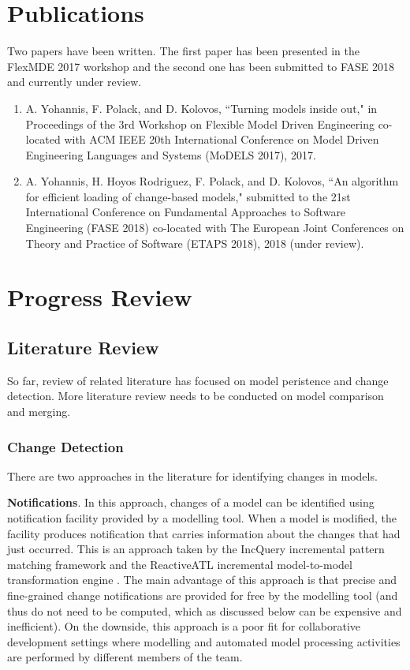 \documentclass[12pt, a4paper]{report} \usepackage[titletoc]{appendix}
\begin{document}
\chapter{Publications}
\label{ch:publications}
Two papers have been written. The first paper \cite{yohannis2017turning} has been presented in the FlexMDE 2017 workshop and the second one \cite{yohannis2018algorithm} has been submitted to FASE 2018 and currently under review.
\begin{enumerate}
	\item A. Yohannis, F. Polack, and D. Kolovos, ``Turning models inside out," in Proceedings of the 3rd Workshop on Flexible Model Driven Engineering co-located with ACM IEEE 20th International Conference on Model Driven Engineering Languages and Systems (MoDELS 2017), 2017.
	\item  A. Yohannis, H. Hoyos Rodriguez, F. Polack, and D. Kolovos, ``An algorithm for efficient loading of change-based models," submitted to the 21st International Conference on Fundamental Approaches to Software Engineering (FASE 2018) co-located with The European Joint Conferences on Theory and Practice of Software (ETAPS 2018), 2018 (under review).
\end{enumerate}

\chapter{Progress Review}
\label{ch:progress_review}

\section{Literature Review}
\label{sec:literature_review}
So far, review of related literature has focused on model peristence and change detection. More literature review needs to be conducted on model comparison and merging.  

\subsection{Change Detection}
\label{subsec:change_detection}
There are two approaches in the literature for identifying changes in models.

\textbf{Notifications}. In this approach, changes of a model can be identified using  notification facility provided by a modelling tool. When a model is modified, the facility produces notification that carries information about the changes that had just occurred. This is an approach taken by the IncQuery incremental pattern matching framework \cite{rath2012derived} and the ReactiveATL incremental model-to-model transformation engine \cite{ogunyomi2015property}. The main advantage of this approach is that precise and fine-grained change notifications are provided for free by the modelling tool (and thus do not need to be computed, which as discussed below can be expensive and inefficient). On the downside, this approach is a poor fit for collaborative development settings where modelling and automated model processing activities are performed by different members of the team.
\end{document}
